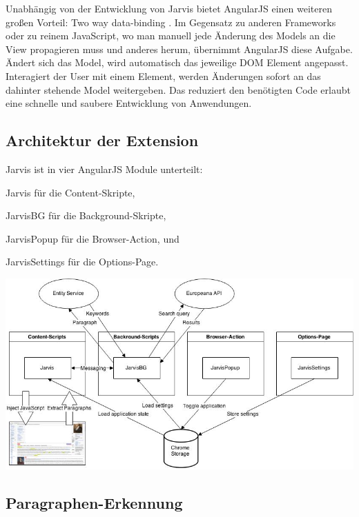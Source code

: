  Unabhängig von der Entwicklung von Jarvis bietet AngularJS einen weiteren großen Vorteil: Two way data-binding \cite{jain2015angularjs}. Im Gegensatz zu anderen Frameworks oder zu reinem JavaScript, wo man manuell jede Änderung des Models an die View propagieren muss und anderes herum, übernimmt AngularJS diese Aufgabe. Ändert sich das Model, wird automatisch das jeweilige DOM Element angepasst. Interagiert der User mit einem Element, werden Änderungen sofort an das dahinter stehende Model weitergeben. Das reduziert den benötigten Code erlaubt eine schnelle und saubere Entwicklung von Anwendungen.

 \subsection{Architektur der Extension}
 Jarvis ist in vier AngularJS Module unterteilt:
 \begin{enumerate*}[label=\alph*\upshape)]
 	\item Jarvis für die Content-Skripte,
  	\item JarvisBG für die Background-Skripte,
 	\item JarvisPopup für die Browser-Action, und
 	\item JarvisSettings für die Options-Page.
 \end{enumerate*}

 \begin{minipage}{\linewidth}
	\centering
	\includegraphics[width=\linewidth]{Bilder/architektur.jpg}
	\label{fig:architektur}
 \end{minipage}


 \subsection{Paragraphen-Erkennung}
